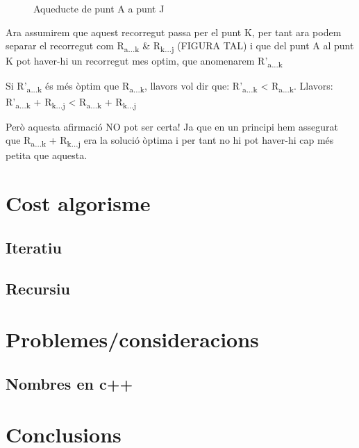 \documentclass[12pt, letterpaper]{article}
\begin{document}
\begin{figure}[hbt!]
\begin{center}
\caption{Aqueducte de punt A a punt J}
\label{demostracio:atoj}
\end{center}
\end{figure}

Ara assumirem que aquest recorregut passa per el punt K, per tant ara podem separar el recorregut com R\textsubscript{a...k} \& R\textsubscript{k...j} (FIGURA TAL) i que del punt A al punt K pot haver-hi un recorregut mes optim, que anomenarem R'\textsubscript{a...k} 


Si R'\textsubscript{a...k} és més òptim que R\textsubscript{a...k}, llavors vol dir que:
R'\textsubscript{a...k} < R\textsubscript{a...k}.
Llavors:
R'\textsubscript{a...k} + R\textsubscript{k...j} < R\textsubscript{a...k} + R\textsubscript{k...j} 

Però aquesta afirmació NO pot ser certa! Ja que en un principi hem assegurat que R\textsubscript{a...k} + R\textsubscript{k...j} era la solució òptima i per tant no hi pot haver-hi cap més petita que aquesta.


\section{Cost algorisme}
\subsection{Iteratiu}
\subsection{Recursiu}
    
\section{Problemes/consideracions}
\subsection{Nombres en c++}

\section{Conclusions}
\end{document}
